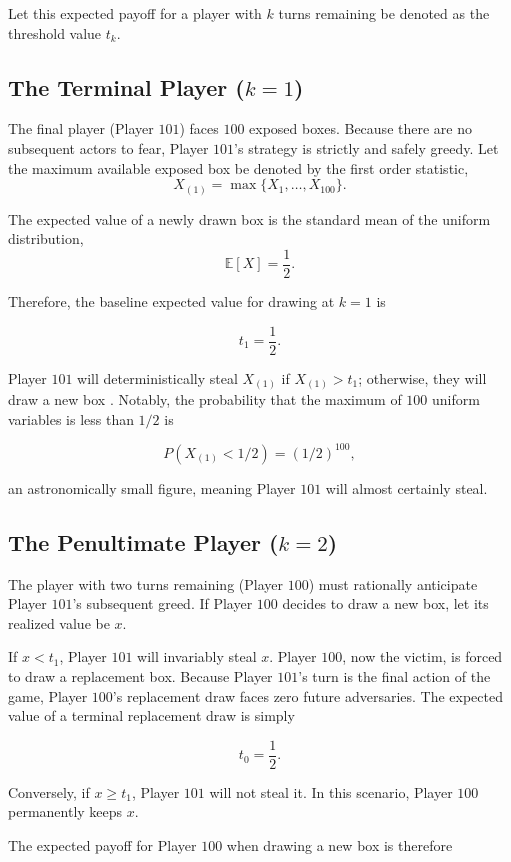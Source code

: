 \documentclass{article}
\begin{document}
Let this expected payoff for a player with $k$ turns remaining be denoted as the threshold value $t_k$.

\subsection{The Terminal Player ($k=1$)}

The final player (Player $101$) faces $100$ exposed boxes. Because there are no subsequent actors to fear, Player $101$'s strategy is strictly and safely greedy. Let the maximum available exposed box be denoted by the first order statistic,
\[
X_{(1)} = \max\{X_1,\dots,X_{100}\}.
\]

The expected value of a newly drawn box is the standard mean of the uniform distribution,
\[
\mathbb{E}[X] = \frac{1}{2}.
\]

Therefore, the baseline expected value for drawing at $k=1$ is

\[
t_1 = \frac{1}{2}.
\]

Player $101$ will deterministically steal $X_{(1)}$ if $X_{(1)} > t_1$; otherwise, they will draw a new box . Notably, the probability that the maximum of $100$ uniform variables is less than $1/2$ is

\[
P(X_{(1)} < 1/2) = (1/2)^{100},
\]

an astronomically small figure, meaning Player $101$ will almost certainly steal.

\subsection{The Penultimate Player ($k=2$)}

The player with two turns remaining (Player $100$) must rationally anticipate Player $101$'s subsequent greed. If Player $100$ decides to draw a new box, let its realized value be $x$.

If $x < t_1$, Player $101$ will invariably steal $x$. Player $100$, now the victim, is forced to draw a replacement box. Because Player $101$'s turn is the final action of the game, Player $100$'s replacement draw faces zero future adversaries. The expected value of a terminal replacement draw is simply

\[
t_0 = \frac{1}{2}.
\]

Conversely, if $x \ge t_1$, Player $101$ will not steal it. In this scenario, Player $100$ permanently keeps $x$.

The expected payoff for Player $100$ when drawing a new box is therefore
\end{document}
